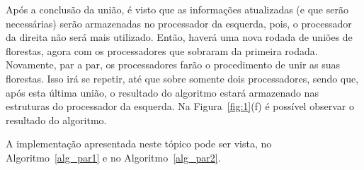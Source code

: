 \documentclass[12pt]{article}
\begin{document}
Após a conclusão da união, é visto que as informações atualizadas (e que serão necessárias) serão armazenadas no processador da esquerda, pois, o processador da direita não será mais utilizado. Então, haverá uma nova rodada de uniões de florestas, agora com os processadores que sobraram da primeira rodada. Novamente, par a par, os processadores farão o procedimento de unir as suas florestas. Isso irá se repetir, até que sobre somente dois processadores, sendo que, após esta última união, o resultado do algoritmo estará armazenado nas estruturas do processador da esquerda. Na Figura~\ref{fig:1}(f) é possível observar o resultado do algoritmo.

A implementação apresentada neste tópico pode ser vista, no Algoritmo~\ref{alg_par1} e no Algoritmo~\ref{alg_par2}.
\end{document}

